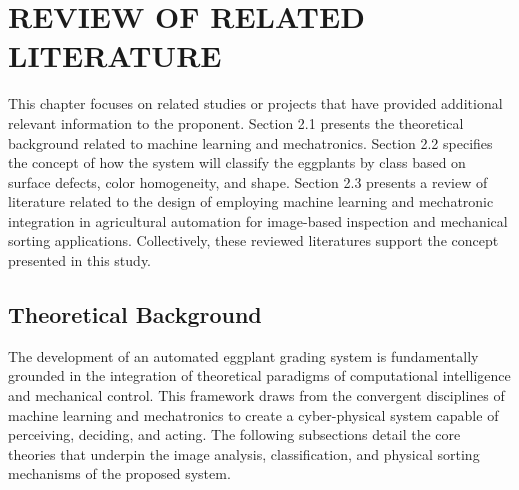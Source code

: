 \chapter{REVIEW OF RELATED LITERATURE}
{\baselineskip
 This chapter focuses on related studies or projects that have provided additional relevant information to the proponent. Section 2.1 presents the theoretical background related to machine learning and mechatronics. Section 2.2 specifies the concept of how the system will classify the eggplants by class based on surface defects, color homogeneity, and shape. Section 2.3 presents a review of literature related to the design of employing machine learning and mechatronic integration in agricultural automation for image-based inspection and mechanical sorting applications. Collectively, these reviewed literatures support the concept presented in this study. 

\section{Theoretical Background}
The development of an automated eggplant grading system is fundamentally grounded in the integration of theoretical paradigms of computational intelligence and mechanical control. This framework draws from the convergent disciplines of machine learning and mechatronics to create a cyber-physical system capable of perceiving, deciding, and acting. The following subsections detail the core theories that underpin the image analysis, classification, and physical sorting mechanisms of the proposed system.

}
